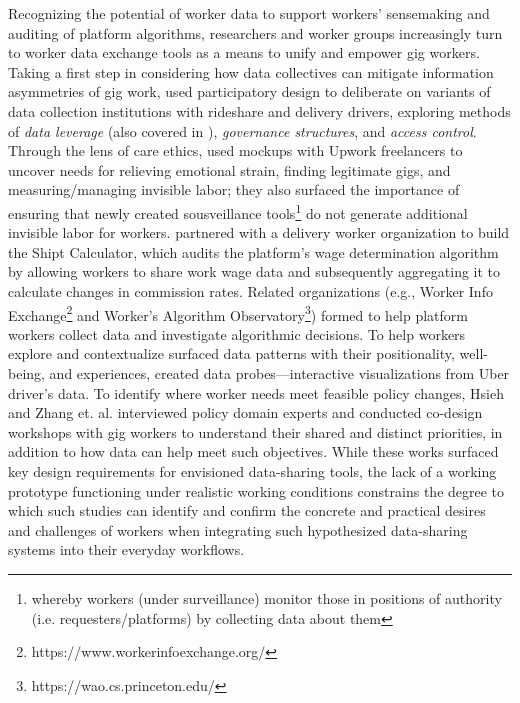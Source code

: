 Recognizing the potential of worker data to support workers' sensemaking and auditing of platform algorithms, researchers and worker groups increasingly turn to worker data exchange tools as a means to {unify and} empower gig workers.  
{Taking a first step in considering how data collectives can mitigate information asymmetries of gig work, }\citet{uuapp} {used participatory design to deliberate on} variants of data collection institutions with rideshare and delivery drivers, exploring methods of \textit{data leverage} (also covered in \cite{levers}), \textit{governance structures}, and \textit{access control}.
Through the lens of care ethics, \citet{sousveillance} used mockups with Upwork freelancers to uncover needs for relieving emotional strain, finding legitimate gigs, and measuring/managing invisible labor; they also surfaced the importance of ensuring that newly created sousveillance tools\footnote{whereby workers (under surveillance) monitor those in positions of authority (i.e. requesters/platforms) by collecting data about them} do not generate additional invisible labor for workers. 
\citet{6B4U} partnered with a delivery worker organization to {build} the Shipt Calculator, which {audits the platform's wage determination algorithm by allowing workers to} share work wage data and subsequently aggregat{ing it to calculate changes in} commission rate{s}. 
{Related} organizations (e.g., Worker Info Exchange\footnote{https://www.workerinfoexchange.org/} and Worker's Algorithm Observatory\footnote{https://wao.cs.princeton.edu/}) formed to help platform workers collect data and investigate algorithmic decisions. 
To help {workers} explore and contextualize {surfaced} data patterns with their positionality, well-being, and experiences, \citet{zhang2023stakeholder} create{d} data probes---interactive visualizations from {Uber driver}'s data. {To identify where worker needs meet feasible policy changes, Hsieh and Zhang et. al.} \cite{supporting} interviewed policy domain experts and conducted co-design workshops with gig workers to {understand their shared and distinct priorities, in addition to how data can help meet such objectives. While these works surfaced key design requirements for envisioned data-sharing tools, the lack of a working prototype functioning under realistic working conditions constrains the degree to which such studies can identify and confirm the concrete and practical desires and challenges of workers when integrating such hypothesized data-sharing systems into their everyday workflows}.

